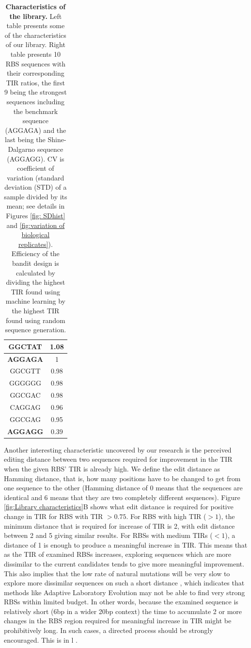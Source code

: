 \documentclass{article}
\begin{document}
\begin{table}[!h]
\begin{minipage}[c]{0.38\textwidth}
\begin{tabular}{|c|c|}
GGCTAT                & 1.08              \\ \hline
\textbf{AGGAGA}                & 1                  \\ \hline
GGCGTT                & 0.98            \\ \hline
GGGGGG                & 0.98             \\ \hline
GGCGAC                & 0.98             \\ \hline
CAGGAG                & 0.96             \\ \hline
GGCGAG                & 0.95             \\ \hline
\textbf{AGGAGG}       & 0.39            \\ \hline
\end{tabular}
\end{minipage}
\caption{\textbf{Characteristics of the library.}
Left table presents some of the characteristics of our library.
Right table presents 10 RBS sequences with their corresponding TIR ratios, the first 9 being the strongest sequences including the benchmark sequence (AGGAGA) and the last being the Shine-Dalgarno sequence (AGGAGG).
CV is coefficient of variation (standard deviation (STD) of a sample divided by its mean; see details in Figures \ref{fig: SDhist} and \ref{fig:variation of biological replicates}).
Efficiency of the bandit design is calculated by dividing the highest TIR found using machine learning by the highest TIR found using random sequence generation. }
\end{table}

Another interesting characteristic uncovered by our research is the perceived editing distance between two sequences required for  improvement in the TIR when the given RBS' TIR is already high. 
We define the edit distance as Hamming distance, that is, how many positions have to be changed to get from one sequence to the other (Hamming distance of 0 means that the sequences are identical and 6 means that they are two completely different sequences).
Figure \ref{fig:Library characteristics}B shows what edit distance is required for positive change in TIR for RBS with TIR $>0.75$.
For RBS with high TIR ($>1$), the minimum distance that is required for increase of TIR is 2, with edit distance between 2 and 5 giving similar results.
For RBSs with medium TIRs ($<1$), a distance of 1 is enough to produce a meaningful increase in TIR.
This means that as the TIR of examined RBSs increases, exploring sequences which are more dissimilar to the current candidates tends to give more meaningful improvement. 
This also implies that the low rate of natural mutations will be very slow to explore more dissimilar sequences on such a short distance \cite{Lee2012}, which indicates that methods like Adaptive Laboratory Evolution may not be able to find very strong RBSs within limited budget.  
In other words, because the examined sequence is relatively short (6bp in a wider 20bp context) the time to accumulate 2 or more changes in the RBS region required for meaningful increase in TIR might be prohibitively long.
In such cases, a directed process should be strongly encouraged.
This is in l \cite{Jackel2008}.\\
\end{document}
